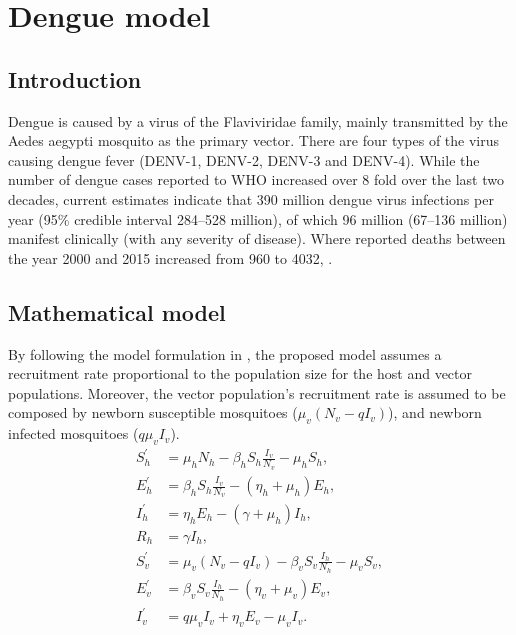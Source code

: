 \documentclass{book}\usepackage[]{graphicx}\usepackage[]{color}
\begin{document}

\section{Dengue model}

\subsection*{Introduction}
Dengue is caused by a virus of the Flaviviridae family, mainly transmitted by the Aedes aegypti mosquito as the primary vector.
%
There are four types of the virus causing dengue fever (DENV-1, DENV-2, DENV-3 and DENV-4).
%
While the number of dengue cases reported to WHO increased over 8 fold over the last two decades, current estimates indicate that 390 million dengue virus infections per year (95\% credible interval 284–528 million), of which 96 million (67–136 million) manifest clinically (with any severity of disease). Where reported deaths between the year 2000 and 2015 increased from 960 to 4032, \cite{world2014dengue}.

\subsection*{Mathematical model}
By following the model formulation in \cite{brauer2019mathematical}, the proposed model assumes a recruitment rate proportional to the population size for the host and vector populations. Moreover, the vector population's recruitment rate is assumed to be composed by newborn susceptible mosquitoes ($\mu_v(N_v-qI_v)$), and newborn infected mosquitoes ($q\mu_v I_v$).
%
\begin{align}
\label{eq:denguemodel}
\nonumber S_{h}^{\prime} &=\mu_{h} N_{h}-\beta_{h} S_{h}\frac{I_{v}}{N_{v}}-\mu_{h} S_{h}, \\
\nonumber E_{h}^{\prime} &=\beta_{h} S_{h} \frac{I_{v}}{N_{v}}-\left(\eta_{h}+\mu_{h}\right) E_{h}, \\
\nonumber I_{h}^{\prime} &=\eta_{h} E_{h}-\left(\gamma+\mu_{h}\right) I_{h},\\
R_h &= \gamma I_h,\\
\nonumber S_{v}^{\prime} &=\mu_{v}\left(N_{v}-qI_{v}\right)-\beta_{v} S_{v} \frac{I_{h}}{N_{h}}-\mu_{v} S_{v}, \\
\nonumber E_{v}^{\prime} &=\beta_{v} S_{v} \frac{I_{h}}{N_{h}}-\left(\eta_{v}+\mu_{v}\right) E_{v}, \\
\nonumber I_{v}^{\prime} &=q \mu_{v} I_{v}+\eta_{v} E_{v}-\mu_{v} I_{v}.
\end{align}
\end{document}
